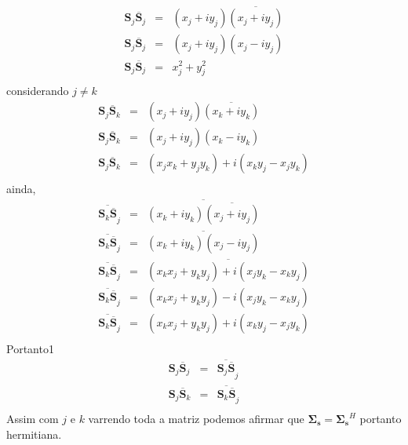 \begin{equation}\label{eqn3}
\begin{array}{ccc}
\mathbf{S}_j\overline{\mathbf{S}}_j&=& (x_j+iy_j)\overline{(x_j+iy_j)} \\
\mathbf{S}_j\overline{\mathbf{S}}_j&=& (x_j+iy_j)(x_j-iy_j) \\
\mathbf{S}_j\overline{\mathbf{S}}_j&=& x_j^2+y_j^2 \\
\end{array}
\end{equation}
considerando $j \neq k$
\begin{equation}\label{eqn4}
\begin{array}{ccc}
\mathbf{S}_j\overline{\mathbf{S}}_k&=& (x_j+iy_j)\overline{(x_k+iy_k)} \\
\mathbf{S}_j\overline{\mathbf{S}}_k&=& (x_j+iy_j)(x_k-iy_k) \\
\mathbf{S}_j\overline{\mathbf{S}}_k&=& (x_jx_k+y_jy_k)+i(x_ky_j-x_jy_k) \\
\end{array}
\end{equation}
ainda,
\begin{equation}\label{eqn5}
\begin{array}{ccc}
	\overline{\mathbf{S}_k\overline{\mathbf{S}}}_j&=&\overline{ (x_k+iy_k)\overline{(x_j+iy_j)} }\\
	\overline{\mathbf{S}_k\overline{\mathbf{S}}}_j&=&\overline{ (x_k+iy_k)(x_j-iy_j)} \\
	\overline{\mathbf{S}_k\overline{\mathbf{S}}}_j&=&\overline{ (x_kx_j+y_ky_j)+i(x_jy_k-x_ky_j) }\\
	\overline{\mathbf{S}_k\overline{\mathbf{S}}}_j&=&(x_kx_j+y_ky_j)-i(x_jy_k-x_ky_j) \\
	\overline{\mathbf{S}_k\overline{\mathbf{S}}}_j&=&(x_kx_j+y_ky_j)+i(x_ky_j-x_jy_k) \\
\end{array}
\end{equation}
Portanto1
\begin{equation}\label{eqn6}
\begin{array}{ccc}
	\mathbf{S}_j\overline{\mathbf{S}}_j&=&\overline{\mathbf{S}_j\overline{\mathbf {S}}}_j \\
	\mathbf{S}_j\overline{\mathbf{S}}_k&=&\overline{\mathbf{S}_k\overline{\mathbf {S}}}_j \\
\end{array}
\end{equation}
Assim com $j$ e $k$ varrendo toda a matriz podemos afirmar que $\mathbf{\Sigma_{\mathbf{s}}}=\mathbf{\Sigma_{ s}}^H$ portanto hermitiana.


